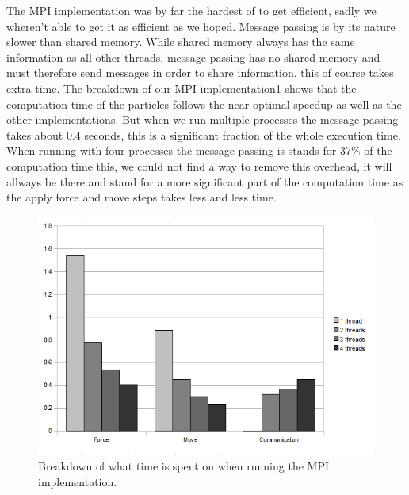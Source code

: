 The MPI implementation was by far the hardest of to get efficient, sadly we
wheren't able to get it as efficient as we hoped. Message passing is by its
nature slower than shared memory. While shared memory always has the same
information as all other threads, message passing has no shared memory and must
therefore send messages in order to share information, this of course takes
extra time. The breakdown of our MPI implementation\ref{breakdown} shows that the
computation time of the particles follows the near optimal speedup as well as
the other implementations. But when we run multiple processes the message
passing takes about 0.4 seconds, this is a significant fraction of the whole
execution time. When running with four processes the message passing is stands for
37\% of the computation time this, we could not find a way to remove this
overhead, it will allways be there and stand for a more significant part of the
computation time as the apply force and move steps takes less and less time.
\begin{figure}[H]
    \label{breakdown}
	\includegraphics{mpilol}
	\caption{Breakdown of what time is spent on when running the MPI
    implementation.}
\end{figure}

